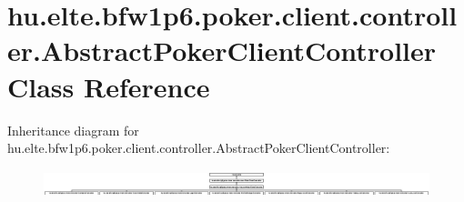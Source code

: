 \hypertarget{classhu_1_1elte_1_1bfw1p6_1_1poker_1_1client_1_1controller_1_1_abstract_poker_client_controller}{}\section{hu.\+elte.\+bfw1p6.\+poker.\+client.\+controller.\+Abstract\+Poker\+Client\+Controller Class Reference}
\label{classhu_1_1elte_1_1bfw1p6_1_1poker_1_1client_1_1controller_1_1_abstract_poker_client_controller}
Inheritance diagram for hu.\+elte.\+bfw1p6.\+poker.\+client.\+controller.\+Abstract\+Poker\+Client\+Controller\+:\begin{figure}[H]
\begin{center}
\leavevmode
\includegraphics[height=0.794045cm]{classhu_1_1elte_1_1bfw1p6_1_1poker_1_1client_1_1controller_1_1_abstract_poker_client_controller}
\end{center}
\end{figure}
